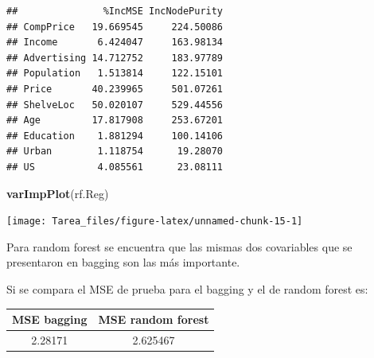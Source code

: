 \documentclass[
]{article}
\newenvironment{Shaded}{\begin{snugshade}}{\end{snugshade}}
\newcommand{\DataTypeTok}[1]{\textcolor[rgb]{0.13,0.29,0.53}{#1}}
\newcommand{\KeywordTok}[1]{\textcolor[rgb]{0.13,0.29,0.53}{\textbf{#1}}}
\newcommand{\NormalTok}[1]{#1}
\newcommand{\OperatorTok}[1]{\textcolor[rgb]{0.81,0.36,0.00}{\textbf{#1}}}
\newcommand{\OtherTok}[1]{\textcolor[rgb]{0.56,0.35,0.01}{#1}}
\newcommand{\StringTok}[1]{\textcolor[rgb]{0.31,0.60,0.02}{#1}}
\begin{document}
\begin{verbatim}
##               %IncMSE IncNodePurity
## CompPrice   19.669545     224.50086
## Income       6.424047     163.98134
## Advertising 14.712752     183.97789
## Population   1.513814     122.15101
## Price       40.239965     501.07261
## ShelveLoc   50.020107     529.44556
## Age         17.817908     253.67201
## Education    1.881294     100.14106
## Urban        1.118754      19.28070
## US           4.085561      23.08111
\end{verbatim}

\begin{Shaded}
\begin{Highlighting}[]
\KeywordTok{varImpPlot}\NormalTok{(rf.Reg)}
\end{Highlighting}
\end{Shaded}

\begin{center}\texttt{[image: Tarea\_files/figure-latex/unnamed-chunk-15-1]} \end{center}

Para random forest se encuentra que las mismas dos covariables que se
presentaron en bagging son las más importante.

Si se compara el MSE de prueba para el bagging y el de random forest es:

\begin{Shaded}
\end{Shaded}

\begin{table}[H]
\centering
\begin{tabular}{cc}
\toprule
MSE bagging & MSE random forest\\
\midrule
2.28171 & 2.625467\\
\bottomrule
\end{tabular}
\end{table}
\end{document}
